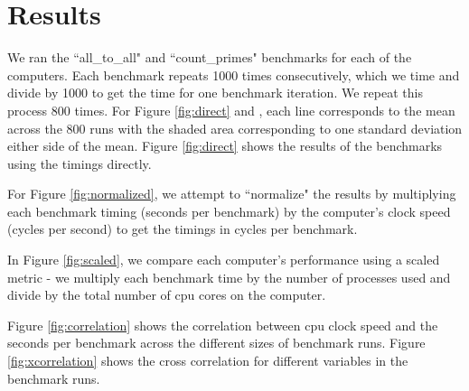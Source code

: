 \documentclass{article}
\newcommand\todoChris[1]{\todo[author=Chris,color=orange,inline]{#1}}
\begin{document}
\section{Results}
\todoChris{}

We ran the ``all\_to\_all" and ``count\_primes" benchmarks for each of the computers. Each benchmark repeats 1000 times consecutively, which we time and divide by 1000 to get the time for one benchmark iteration. We repeat this process 800 times. For Figure \ref{fig:direct} and , each line corresponds to the mean across the 800 runs with the shaded area corresponding to one standard deviation either side of the mean. Figure \ref{fig:direct} shows the results of the benchmarks using the timings directly. 

For Figure \ref{fig:normalized}, we attempt to ``normalize" the results by multiplying each benchmark timing (seconds per benchmark) by the computer's clock speed (cycles per second) to get the timings in cycles per benchmark. 

In Figure \ref{fig:scaled}, we compare each computer's performance using a scaled metric - we multiply each benchmark time by the number of processes used and divide by the total number of cpu cores on the computer. 

Figure \ref{fig:correlation} shows the correlation between cpu clock speed and the seconds per benchmark across the different sizes of benchmark runs. Figure \ref{fig:xcorrelation} shows the cross correlation for different variables in the benchmark runs.
\end{document}
